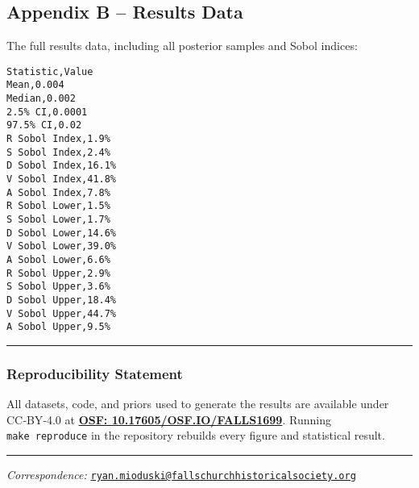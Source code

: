 \documentclass[
  11pt,
]{article}
\begin{document}
\subsection{Appendix B -- Results Data}\label{appendix-b-results-data}

The full results data, including all posterior samples and Sobol
indices:

\begin{verbatim}
Statistic,Value
Mean,0.004
Median,0.002
2.5% CI,0.0001
97.5% CI,0.02
R Sobol Index,1.9%
S Sobol Index,2.4% 
D Sobol Index,16.1%
V Sobol Index,41.8%
A Sobol Index,7.8%
R Sobol Lower,1.5%
S Sobol Lower,1.7%
D Sobol Lower,14.6%
V Sobol Lower,39.0%
A Sobol Lower,6.6%
R Sobol Upper,2.9%
S Sobol Upper,3.6%
D Sobol Upper,18.4%
V Sobol Upper,44.7%
A Sobol Upper,9.5%
\end{verbatim}

\begin{center}\rule{0.5\linewidth}{0.5pt}\end{center}

\subsubsection{Reproducibility
Statement}\label{reproducibility-statement}

All datasets, code, and priors used to generate the results are
available under CC‑BY‑4.0 at \textbf{\href{https://osf.io/}{OSF:
10.17605/OSF.IO/FALLS1699}}. Running \texttt{make\ reproduce} in the
repository rebuilds every figure and statistical result.

\begin{center}\rule{0.5\linewidth}{0.5pt}\end{center}

\emph{Correspondence:}
\href{mailto:ryan.mioduski@fallschurchhistoricalsociety.org}{\nolinkurl{ryan.mioduski@fallschurchhistoricalsociety.org}}
\end{document}
